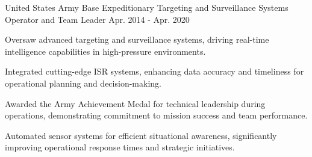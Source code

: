 \begin{cventries}
      \cventry
        {United States Army} %
        {Base Expeditionary Targeting and Surveillance Systems Operator and Team Leader} %
        {} %
        {Apr. 2014 - Apr. 2020} %
        {
          \begin{cvitems} %
          \item {Oversaw advanced targeting and surveillance systems, driving real-time intelligence capabilities in high-pressure environments.}
    \item {Integrated cutting-edge ISR systems, enhancing data accuracy and timeliness for operational planning and decision-making.}
    \item {Awarded the Army Achievement Medal for technical leadership during operations, demonstrating commitment to mission success and team performance.}
    \item {Automated sensor systems for efficient situational awareness, significantly improving operational response times and strategic initiatives.}
          \end{cvitems}
        }
\end{cventries}
